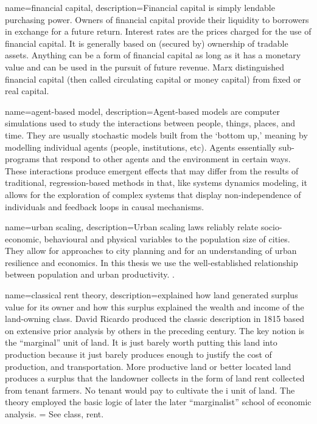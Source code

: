 {
name=financial capital,
description={Financial capital is simply lendable purchasing power. Owners of financial capital provide their liquidity to borrowers in exchange for a future return. Interest rates are the prices charged for the use of financial capital. It is generally based on (secured by) ownership of tradable assets.  Anything can be a form of financial capital as long as it has a monetary value and can be  used in the pursuit of future revenue. Marx distinguished  financial capital (then called circulating capital or money capital) from fixed or real capital.}
}

{
name=agent-based model,
description={Agent-based models are computer simulations used to study the interactions between people, things, places, and time. They are usually stochastic models built from the `bottom up,' meaning by modelling individual agents (people, institutions, etc). Agents essentially sub-programs that respond to other agents and the environment in certain ways. These interactions produce emergent effects that may differ from the results of traditional, regression-based methods in that, like systems dynamics modeling, it allows for the exploration of complex systems that display non-independence of individuals and \gls{feedback} loops in causal mechanisms.}
}

{
name=urban scaling,
description={Urban scaling laws reliably relate socio-economic, behavioural and physical variables to the population size of cities. They allow for approaches  to city planning and for an understanding of urban resilience and economics. In this thesis we use the well-established relationship between population and urban productivity. \cite{doi:10.1098/rsif.2020.0705}}.
}

{
name=classical rent theory,
description={explained how land generated surplus value for its owner and how this surplus explained the wealth and income of the land-owning class. David Ricardo produced the classic description in 1815 based on extensive prior analysis by others in the preceding century. The key notion is the ``marginal'' unit of land. It is just barely worth putting this land into production because it just barely produces enough to justify the cost of production, and transportation. More productive land or better located land produces a surplus that the landowner  collects in the form of land rent collected from tenant farmers. No tenant would pay to cultivate the  i unit of land. The theory employed the basic logic of later the later ``marginalist''  school of economic analysis. = See \gls{class}, \gls{rent}.}
}

